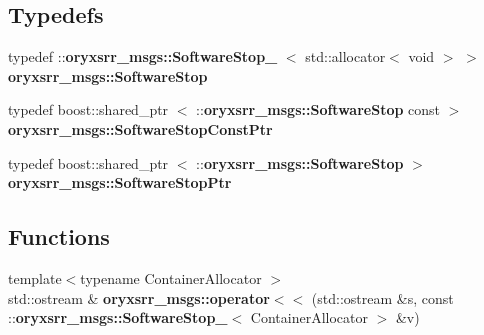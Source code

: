 \subsection*{\-Typedefs}
\begin{DoxyCompactItemize}
\item 
typedef \*
\-::{\bf oryxsrr\-\_\-msgs\-::\-Software\-Stop\-\_\-}\*
$<$ std\-::allocator$<$ void $>$ $>$ {\bf oryxsrr\-\_\-msgs\-::\-Software\-Stop}
\item 
typedef boost\-::shared\-\_\-ptr\*
$<$ \-::{\bf oryxsrr\-\_\-msgs\-::\-Software\-Stop} \*
const  $>$ {\bf oryxsrr\-\_\-msgs\-::\-Software\-Stop\-Const\-Ptr}
\item 
typedef boost\-::shared\-\_\-ptr\*
$<$ \-::{\bf oryxsrr\-\_\-msgs\-::\-Software\-Stop} $>$ {\bf oryxsrr\-\_\-msgs\-::\-Software\-Stop\-Ptr}
\end{DoxyCompactItemize}
\subsection*{\-Functions}
\begin{DoxyCompactItemize}
\item 
{\footnotesize template$<$typename Container\-Allocator $>$ }\\std\-::ostream \& {\bf oryxsrr\-\_\-msgs\-::operator$<$$<$} (std\-::ostream \&s, const \-::{\bf oryxsrr\-\_\-msgs\-::\-Software\-Stop\-\_\-}$<$ \-Container\-Allocator $>$ \&v)
\end{DoxyCompactItemize}
